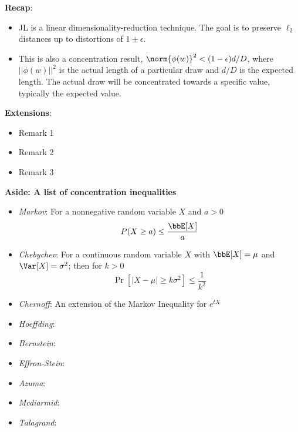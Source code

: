 \noindent\textbf{Recap}: 

\begin{itemize}
\item JL is a linear dimensionality-reduction technique. The goal is
  to preserve $\ell_{2}$ distances up to distortions of $1\pm
  \epsilon$. 

\item This is also a concentration result, $\norm{\phi(w)}^{2} <
  (1-\epsilon)d/D$, where $||\phi(w)||^{2}$ is the actual length of a
  particular draw and $d/D$ is the expected length. The actual draw
  will be concentrated towards a specific value, typically the
  expected value.  

\end{itemize}

\textbf{Extensions}:
\begin{itemize}
  \item Remark 1
  \item Remark 2
  \item Remark 3
\end{itemize}

\textbf{Aside: A list of concentration inequalities}
\begin{itemize}
\item \textit{Markov}: For a nonnegative random variable $X$ and $a > 0$ $$P(X \geq a) \leq \frac{\bbE[X]}{a}$$ 
\item \textit{Chebychev}: For a continuous random variable $X$ with $\bbE[X] = \mu$ and $\Var[X] = \sigma^2$; then for $k>0$
$$\Pr[|X-\mu| \geq k\sigma^2 ] \leq \frac{1}{k^2}$$
\item \textit{Chernoff}: An extension of the Markov Inequality for $e^{tX}$
\item \textit{Hoeffding}: 
\item \textit{Bernstein}: 
\item \textit{Effron-Stein}: 
\item \textit{Azuma}: 
\item \textit{Mcdiarmid}: 
\item \textit{Talagrand}: 
\end{itemize}
